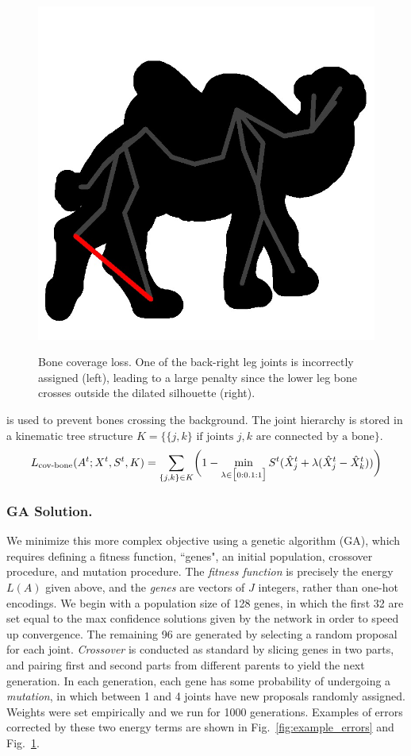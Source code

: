 \begin{figure}[t!]
\begin{floatrow}
{{    \includegraphics[trim={0cm 0cm 0cm 0cm},clip,width=0.45\linewidth]{bone_coverage/bone_error_overlay_cropped.jpg}
    }
}
{\caption{Bone coverage loss. One of the back-right leg joints is incorrectly assigned (left), leading to a large penalty since the lower leg bone crosses outside the dilated silhouette (right).}
\label{fig:cov-bone}
}
\end{floatrow}
\end{figure}

 is used to prevent bones crossing the background. The joint hierarchy is stored in a kinematic tree structure $K = \{\{j,k\} \text{ if joints } j, k \text{ are connected by a bone}\}$.
\begin{equation}
L_{\text{cov-bone}}(A^{t};X^{t},S^{t},K) = \sum_{\{j,k\} \in K}\biggl(1 - \min_{\lambda \in \big[0:0.1:1\big]}S^{t}(\hat{X}_{j}^{t} + \lambda(\hat{X}_{j}^{t} - \hat{X}_{k}^{t}))\biggr)
\end{equation}

\begin{figure}[t!]
    
\end{figure}

\subsubsection*{GA Solution.}
We minimize this more complex objective using a genetic algorithm (GA)\cite{holland1992adaptation}, which requires defining a fitness function, ``genes", an initial population, crossover procedure, and mutation procedure. 
The {\em fitness function} is precisely the energy $L(A)$ given above, and the {\em genes} are vectors of $J$ integers, rather than one-hot encodings.
We begin with a population size of 128 genes, in which the first 32 are set equal to the max confidence solutions given by the network in order to speed up convergence. The remaining 96 are generated by selecting a random proposal for each joint. {\em Crossover} is conducted as standard by slicing genes in two parts, and pairing first and second parts from different parents to yield the next generation. In each generation, each gene has some probability of undergoing a {\em mutation}, in which between 1 and 4 joints have new proposals randomly assigned. Weights were set empirically and we run for 1000 generations.
Examples of errors corrected by these two energy terms are shown in Fig.~\ref{fig:example_errors} and Fig.~\ref{fig:cov-bone}.


